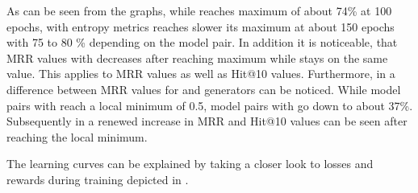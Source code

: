 As can be seen from the graphs, while \origsampling reaches maximum of about 74\% at 100 epochs, \ussoftmax with entropy metrics reaches slower its maximum at about 150 epochs with 75 to 80 \% depending on the model pair.
In addition it is noticeable, that MRR values with \origsampling decreases after reaching maximum while \ussoftmax stays on the same value.
This applies to MRR values as well as Hit@10 values.
Furthermore, in \origsampling a difference between MRR values for \distmult and \complex generators can be noticed.
While model pairs with \distmult reach a local minimum of 0.5, model pairs with \complex go down to about 37\%.
Subsequently in \origsampling a renewed increase in MRR and Hit@10 values can be seen after reaching the local minimum.

The learning curves can be explained by taking a closer look to losses and rewards during training depicted in .
